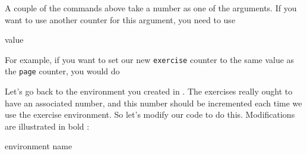 A couple of the commands above take a number  as one of 
the arguments.  If you want to use another counter for this argument, 
you need to use
\begin{definition}
\gls{value}
\end{definition}%
For example, if you want to set our new \texttt{exercise} counter to 
the same value as the \texttt{page} counter, you would do
\begin{codeS}
\end{codeS}%
Let's go back to the  environment you
created in .  The exercises really ought to have
an associated number, and this number should be incremented each time 
we use the exercise environment.  So let's modify our code to do this.
Modifications are illustrated in bold :
\begin{code}\obeyspaces
{}\newline
\strut\newline
{} environment name\newline
{}\newline
{}
\end{code}%
